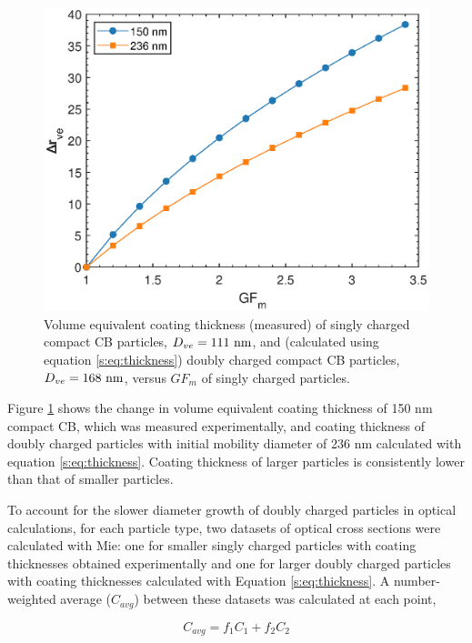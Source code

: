 \documentclass[12pt]{article}
\begin{document}
\begin{figure}[htp]
\centering
\includegraphics[scale=0.7]{fig_supp_thickness_formula.eps}
\caption{Volume equivalent coating thickness (measured) of singly charged compact CB particles, $D_{ve}=111\ \rm nm$, and (calculated using equation \ref{s:eq:thickness}) doubly charged compact CB particles, $D_{ve}=168\ \rm nm$, versus $GF_m$ of singly charged particles.}
\label{s:fig:thickness}
\end{figure}

Figure \ref{s:fig:thickness} shows the change in volume equivalent coating thickness of 150 nm compact CB, which was measured experimentally, and coating thickness of doubly charged particles with initial mobility diameter of 236 nm calculated with equation \ref{s:eq:thickness}. Coating thickness of larger particles is consistently lower than that of smaller particles.

To account for the slower diameter growth of doubly charged particles in optical calculations, for each particle type, two datasets of optical cross sections were calculated with Mie: one for smaller singly charged particles with coating thicknesses obtained experimentally and one for larger doubly charged particles with coating thicknesses calculated with Equation \ref{s:eq:thickness}. A number-weighted average ($C_{avg}$) between these datasets was calculated at each point,

\begin{equation}
    C_{avg}=f_1C_1+f_2C_2
\end{equation}
\end{document}
